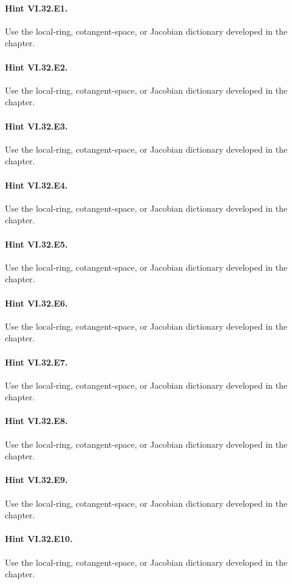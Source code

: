 \paragraph{Hint VI.32.E1.} Use the local-ring, cotangent-space, or Jacobian dictionary developed in the chapter.
\paragraph{Hint VI.32.E2.} Use the local-ring, cotangent-space, or Jacobian dictionary developed in the chapter.
\paragraph{Hint VI.32.E3.} Use the local-ring, cotangent-space, or Jacobian dictionary developed in the chapter.
\paragraph{Hint VI.32.E4.} Use the local-ring, cotangent-space, or Jacobian dictionary developed in the chapter.
\paragraph{Hint VI.32.E5.} Use the local-ring, cotangent-space, or Jacobian dictionary developed in the chapter.
\paragraph{Hint VI.32.E6.} Use the local-ring, cotangent-space, or Jacobian dictionary developed in the chapter.
\paragraph{Hint VI.32.E7.} Use the local-ring, cotangent-space, or Jacobian dictionary developed in the chapter.
\paragraph{Hint VI.32.E8.} Use the local-ring, cotangent-space, or Jacobian dictionary developed in the chapter.
\paragraph{Hint VI.32.E9.} Use the local-ring, cotangent-space, or Jacobian dictionary developed in the chapter.
\paragraph{Hint VI.32.E10.} Use the local-ring, cotangent-space, or Jacobian dictionary developed in the chapter.
